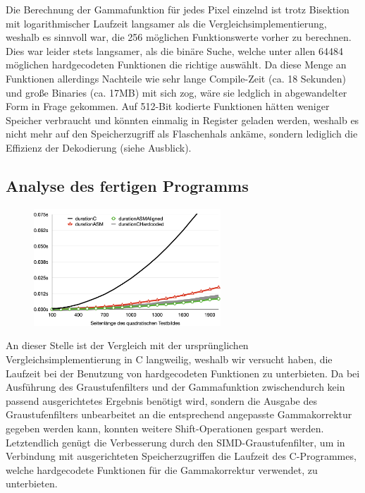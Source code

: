 \documentclass[course=erap]{aspdoc}
\begin{document}
	Die Berechnung der Gammafunktion für jedes Pixel einzelnd ist trotz Bisektion mit logarithmischer Laufzeit langsamer als die Vergleichsimplementierung, weshalb es sinnvoll war, die 256 möglichen Funktionswerte vorher zu berechnen. \\
	Dies war leider stets langsamer, als die binäre Suche, welche unter allen 64484 möglichen hardgecodeten Funktionen die richtige auswählt.
	Da diese Menge an Funktionen allerdings Nachteile wie sehr lange Compile-Zeit (ca. 18 Sekunden) und große Binaries (ca. 17MB) mit sich zog, wäre sie ledglich in abgewandelter Form in Frage gekommen. Auf 512-Bit kodierte Funktionen hätten weniger Speicher verbraucht und könnten einmalig in Register geladen werden, weshalb es nicht mehr auf den Speicherzugriff als Flaschenhals ankäme, sondern lediglich die Effizienz der Dekodierung (siehe Ausblick).
	\subsection{Analyse des fertigen Programms}
	\begin{figure}
		\includegraphics[width=7cm]{Images/Both.png}
	\end{figure}
	An dieser Stelle ist der Vergleich mit der ursprünglichen Vergleichsimplementierung in C langweilig, weshalb wir versucht haben, die Laufzeit bei der Benutzung von hardgecodeten Funktionen zu unterbieten.
	Da bei Ausführung des Graustufenfilters und der Gammafunktion zwischendurch kein passend ausgerichtetes Ergebnis benötigt wird, sondern die Ausgabe des Graustufenfilters unbearbeitet an die entsprechend angepasste Gammakorrektur gegeben werden kann, konnten weitere Shift-Operationen gespart werden.
	Letztendlich genügt die Verbesserung durch den SIMD-Graustufenfilter, um in Verbindung mit ausgerichteten Speicherzugriffen die Laufzeit des C-Programmes, welche hardgecodete Funktionen für die Gammakorrektur verwendet, zu unterbieten.
\end{document}

